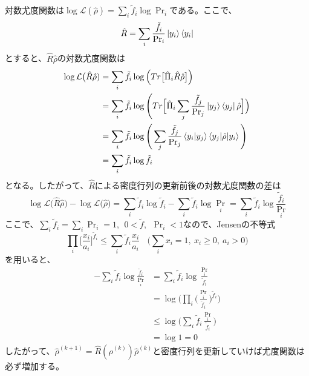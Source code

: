 \documentclass[11pt,a4j,notitlepage]{jreport}
\begin{document}
	対数尤度関数は$\log \mathcal{L} (\hat{\rho}) = \sum_i \tilde{f}_i \log \Pr_i$である。ここで、
	\begin{equation}
		\hat{R} = \sum_i \frac{\tilde{f}_i}{\Pr_i} \ket{y_i} \bra{y_i}
	\end{equation}
	とすると、$\hat{R} \hat{\rho}$の対数尤度関数は
	\begin{equation}
		\begin{aligned}
			\log \mathcal{L} \big( \hat{R} \hat{\rho}) &= \sum_i \tilde{f}_i \log \Big( Tr \big[ \hat{\Pi}_i \hat{R} \hat{\rho} \big] \Big) \\
			&=  \sum_i \tilde{f}_i \log \Bigg( Tr \Big[ \hat{\Pi}_i \sum_j \frac{\tilde{f}_j}{\Pr_j} \ket{y_j} \bra{y_j} \hat{\rho} \Big] \Big) \\
			&= \sum_i \tilde{f}_i \log \Bigg( \sum_j \frac{\tilde{f}_j}{\Pr_j} \braket{y_i | y_j} \braket{y_j | \hat{\rho} | y_i} \Bigg) \\
			&= \sum_i \tilde{f}_i \log \tilde{f}_i
		\end{aligned}
	\end{equation}
	となる。したがって、$\hat{R}$による密度行列の更新前後の対数尤度関数の差は
	\begin{equation}
		\log \mathcal{L} \big( \hat{R} \hat{\rho} \big) - \log \mathcal{L} \big( \hat{\rho} \big) = \sum_i \tilde{f}_i \log \tilde{f}_i - \sum_i \tilde{f}_i \log \Pr_i = \sum_i \tilde{f}_i \log \frac{\tilde{f}_i}{\Pr_i}
	\end{equation}
	ここで、$\sum_i \tilde{f}_i = \sum_i \Pr_i = 1,\ \ 0 < \tilde{f},\ \ \Pr_i < 1$なので、Jensenの不等式
	\begin{equation}
		\prod_i \Big[ \frac{x_i}{a_i} \Big]^{\tilde{f}_i} \leq \sum_i \tilde{f}_i \frac{x_i}{a_i} \ \ \ \ \Big( \sum_i x_i = 1,\ x_i \geq 0,\ a_i > 0 \Big)
	\end{equation}
	を用いると、
	\begin{equation}
		\begin{aligned}
			- \sum_i \tilde{f}_i \log \frac{\tilde{f}_i}{\Pr_i} &= \sum_i \tilde{f}_i \log \frac{\Pr_i}{\tilde{f}_i} \\
			&= \log \Bigg( \prod_i \Big( \frac{\Pr_i}{\tilde{f}_i} \Big)^{\tilde{f}_i} \Bigg) \\
			&\leq \log \Big( \sum_i \tilde{f}_i \frac{\Pr_i}{\tilde{f}_i} \Big) \\
			&= \log 1 = 0
		\end{aligned}
	\end{equation}
	したがって、$\hat{\rho}^{(k+1)} = \hat{R} (\hat{\rho}^{(k)}) \hat{\rho}^{(k)}$と密度行列を更新していけば尤度関数は必ず増加する。
\end{document}
